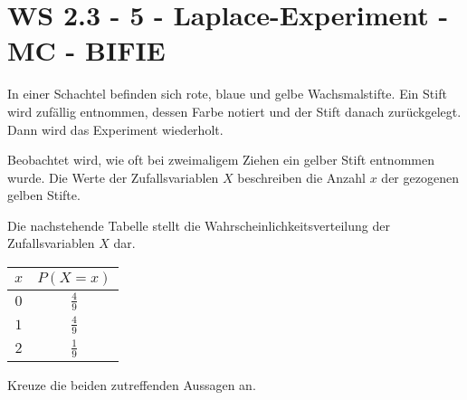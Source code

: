 \section{WS 2.3 - 5 - Laplace-Experiment - MC - BIFIE}

\begin{beispiel}[WS 2.3]{1}
In einer Schachtel befinden sich rote, blaue und gelbe Wachsmalstifte. Ein Stift wird zufällig entnommen, dessen Farbe notiert und der Stift danach zurückgelegt. Dann wird das Experiment wiederholt.

Beobachtet wird, wie oft bei zweimaligem Ziehen ein gelber Stift entnommen wurde. Die Werte der Zufallsvariablen $X$ beschreiben die Anzahl $x$ der gezogenen gelben Stifte.

Die nachstehende Tabelle stellt die Wahrscheinlichkeitsverteilung der Zufallsvariablen $X$ dar.

\renewcommand{\arraystretch}{1.4}
\begin{center}
\begin{tabular}{|c|c|} \hline
$x$ & $P(X=x)$ \\ \hline
$0$ & $\frac{4}{9}$ \\ \hline
$1$ & $\frac{4}{9}$ \\ \hline
$2$ & $\frac{1}{9}$ \\ \hline
\end{tabular}
\end{center}

\leer

Kreuze die beiden zutreffenden Aussagen an.

\end{beispiel}